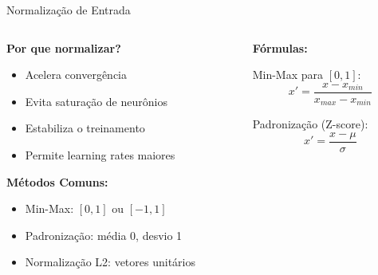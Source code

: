 \documentclass[xcolor=dvipsnames,t,aspectratio=169]{beamer}
\newcommand{\highlight}[1]{{\color{nes_dark_orange} #1}}
\begin{document}
\begin{frame}[c]{Normalização de Entrada}
    \begin{columns}[c]
        \begin{column}{0.5\textwidth}
            \textbf{Por que normalizar?}
            \begin{itemize}
                \item Acelera convergência
                \item Evita saturação de neurônios
                \item Estabiliza o treinamento
                \item Permite learning rates maiores
            \end{itemize}
            
            \vspace{0.5cm}
            \textbf{Métodos Comuns:}
            \begin{itemize}
                \item \highlight{Min-Max}: $[0, 1]$ ou $[-1, 1]$
                \item \highlight{Padronização}: média 0, desvio 1
                \item \highlight{Normalização L2}: vetores unitários
            \end{itemize}
        \end{column}
        \begin{column}{0.5\textwidth}
            \textbf{Fórmulas:}
            
            \vspace{0.3cm}
            Min-Max para $[0,1]$:
            $$x' = \frac{x - x_{min}}{x_{max} - x_{min}}$$
            
            \vspace{0.3cm}
            Padronização (Z-score):
            $$x' = \frac{x - \mu}{\sigma}$$
        \end{column}
    \end{columns}
\end{frame}
\end{document}

